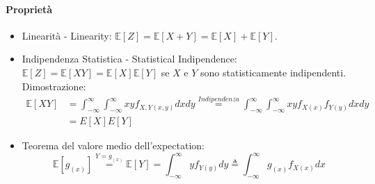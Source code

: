             \paragraph{Proprietà}
                \begin{itemize}
                    \item {\label{linearita expectation} Linearità - Linearity: $\mathbb{E}[Z] = \mathbb{E}[X+Y]  = \mathbb{E}[X] +\mathbb{E}[Y]$.}
                    \item {\label{Indipendenza statistica}Indipendenza Statistica - Statistical Indipendence:$\mathbb{E}[Z] = \mathbb{E}[XY] = \mathbb{E}[X] \mathbb{E}[Y]$ 
                    se $X$ e $Y$ sono statisticamente indipendenti.\\
                    Dimostrazione:
                    \begin{align}
                        \mathbb{E}[XY] &= \int_{-\infty}^{\infty}\int_{-\infty}^{\infty} xy f_{X,Y (x,y)} dxdy \overset{Indipendenza}{=} \int_{-\infty}^{\infty}\int_{-\infty}^{\infty} xy f_{X (x)}f_{Y (y)} dxdy \nonumber \\
                                       &= E[X]E[Y] \nonumber
                    \end{align}
                    }
                    \item {\label{valor medio expectation} Teorema del valore medio dell'expectation: 
                        \[
                            \mathbb{E}[g_{(x)}] \overset{Y=g_{(x)}}{=} \mathbb{E}[Y] =  \int_{-\infty}^{\infty}yf_{Y(y)}dy \triangleq \int_{-\infty}^{\infty}g_{(x)}f_{X(x)}dx
                        \]
                    }
                \end{itemize}
